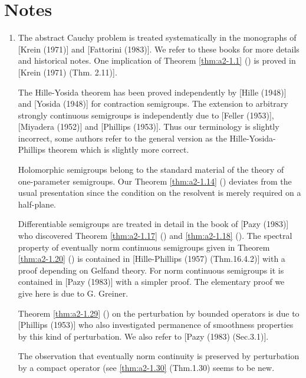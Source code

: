 \section*{Notes}\label{notes:d4-notes}
\begin{enumerate}[label=\emph{Section \arabic*:}, wide, labelindent=0.0em]
\item
The abstract Cauchy problem is treated systematically in the monographs of [Krein (1971)] and [Fattorini (1983)].
We refer to these books for more details and historical notes.
One implication of Theorem \ref{thm:a2-1.1} () is proved in [Krein (1971) (Thm. 2.11)].

The Hille-Yosida theorem has been proved independently by [Hille (1948)] and [Yosida (1948)] for contraction semigroups.
The extension to arbitrary strongly continuous semigroups is independently due to [Feller (1953)], [Miyadera (1952)] and [Phillips (1953)].
Thus our terminology is slightly incorrect, some authors refer to the general version as the Hille-Yosida-Phillips theorem which is slightly more correct.

Holomorphic semigroups belong to the standard material of the theory of one-parameter semigroups.
Our Theorem \ref{thm:a2-1.14} () deviates from the usual presentation since the condition on the resolvent is merely required on a half-plane.

Differentiable semigroups are treated in detail in the book of [Pazy (1983)] who discovered Theorem \ref{thm:a2-1.17} () and \ref{thm:a2-1.18} ().
The spectral property of eventually norm continuous semigroups given in Theorem \ref{thm:a2-1.20} () is contained in [Hille-Phillips (1957) (Thm.16.4.2)] with a proof depending on Gelfand theory.
For norm continuous semigroups it is contained in [Pazy (1983)] with a simpler proof.
The elementary proof we give here is due to G. Greiner.

Theorem \ref{thm:a2-1.29} () on the perturbation by bounded operators is due to [Phillips (1953)] who also investigated permanence of smoothness properties by this kind of perturbation.
We also refer to [Pazy (1983) (Sec.3.1)].

The observation that eventually norm continuity is preserved by perturbation by a compact operator (see \ref{thm:a2-1.30} (\lnm Thm.1.30) seems to be new.


\end{enumerate}
